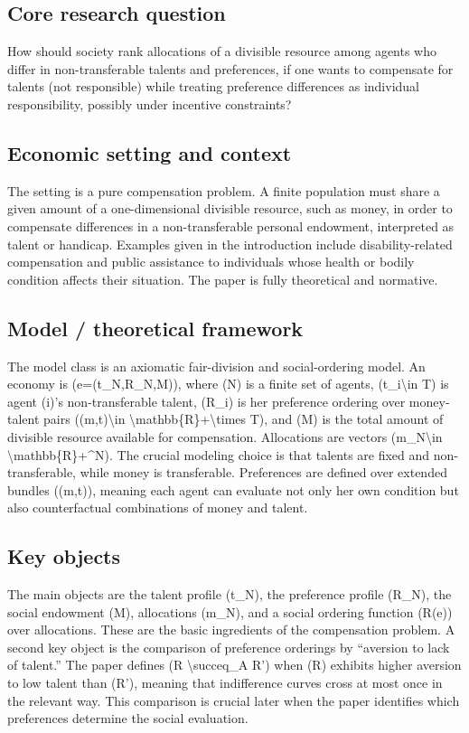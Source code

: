 \documentclass[11pt,a4paper]{article}
\begin{document}
\subsection*{Core research question}
How should society rank allocations of a divisible resource among agents who differ in non-transferable talents and preferences, if one wants to compensate for talents (not responsible) while treating preference differences as individual responsibility, possibly under incentive constraints?

\subsection*{Economic setting and context}
The setting is a pure compensation problem. A finite population must share a given amount of a one-dimensional divisible resource, such as money, in order to compensate differences in a non-transferable personal endowment, interpreted as talent or handicap. Examples given in the introduction include disability-related compensation and public assistance to individuals whose health or bodily condition affects their situation. The paper is fully theoretical and normative.

\subsection*{Model / theoretical framework}
The model class is an axiomatic fair-division and social-ordering model. An economy is (e=(t\_N,R\_N,M)), where (N) is a finite set of agents, (t\_i\textbackslash{}in T) is agent (i)'s non-transferable talent, (R\_i) is her preference ordering over money-talent pairs ((m,t)\textbackslash{}in \textbackslash{}mathbb\{R\}+\textbackslash{}times T), and (M) is the total amount of divisible resource available for compensation. Allocations are vectors (m\_N\textbackslash{}in \textbackslash{}mathbb\{R\}+\textasciicircum{}N). The crucial modeling choice is that talents are fixed and non-transferable, while money is transferable. Preferences are defined over extended bundles ((m,t)), meaning each agent can evaluate not only her own condition but also counterfactual combinations of money and talent.

\subsection*{Key objects}
The main objects are the talent profile (t\_N), the preference profile (R\_N), the social endowment (M), allocations (m\_N), and a social ordering function (R(e)) over allocations. These are the basic ingredients of the compensation problem. A second key object is the comparison of preference orderings by “aversion to lack of talent.” The paper defines (R \textbackslash{}succeq\_A R') when (R) exhibits higher aversion to low talent than (R'), meaning that indifference curves cross at most once in the relevant way. This comparison is crucial later when the paper identifies which preferences determine the social evaluation.
\end{document}
